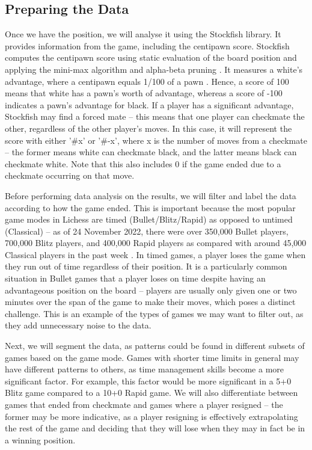 \documentclass[%
 superscriptaddress,
showpacs,preprintnumbers,
 amsmath,
 amssymb,
 aps,
 pra,
showkeys,
onecolumn,
notitlepage,
11pt,
tightenlines      %
]{revtex4-1}
\begin{document}
\subsection{Preparing the Data}
Once we have the position, we will analyse it using the Stockfish library. It provides information from the game, including the centipawn score. Stockfish computes the centipawn score using static evaluation of the board position and applying the mini-max algorithm and alpha-beta pruning \cite{maharaj2022chess}. It measures a white's advantage, where a centipawn equals 1/100 of a pawn \cite{centipawnDefinition}. Hence, a score of 100 means that white has a pawn's worth of advantage, whereas a score of -100 indicates a pawn's advantage for black. If a player has a significant advantage, Stockfish may find a forced mate -- this means that one player can checkmate the other, regardless of the other player's moves. In this case, it will represent the score with either '\#{x}' or '\#{-x}', where x is the number of moves from a checkmate -- the former means white can checkmate black, and the latter means black can checkmate white. Note that this also includes 0 if the game ended due to a checkmate occurring on that move.

Before performing data analysis on the results, we will filter and label the data according to how the game ended. This is important because the most popular game modes in Lichess are timed (Bullet/Blitz/Rapid) as opposed to untimed (Classical) -- as of 24 November 2022, there were over 350,000 Bullet players, 700,000 Blitz players, and 400,000 Rapid players as compared with around 45,000 Classical players in the past week \cite{lichessBlitzRatingDistribution}. In timed games, a player loses the game when they run out of time regardless of their position. It is a particularly common situation in Bullet games that a player loses on time despite having an advantageous position on the board -- players are usually only given one or two minutes over the span of the game to make their moves, which poses a distinct challenge. This is an example of the types of games we may want to filter out, as they add unnecessary noise to the data.

Next, we will segment the data, as patterns could be found in different subsets of games based on the game mode. Games with shorter time limits in general may have different patterns to others, as time management skills become a more significant factor. For example, this factor would be more significant in a 5+0 Blitz game compared to a 10+0 Rapid game. We will also differentiate between games that ended from checkmate and games where a player resigned -- the former may be more indicative, as a player resigning is effectively extrapolating the rest of the game and deciding that they will lose when they may in fact be in a winning position.
\end{document}
